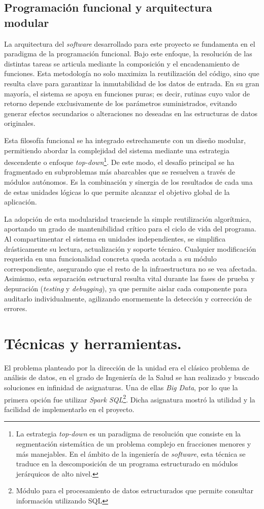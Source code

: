 \subsection{Programación funcional y arquitectura modular}
La arquitectura del \textit{software} desarrollado para este proyecto se fundamenta en el paradigma de la programación funcional. Bajo este enfoque, la resolución de las distintas tareas se articula mediante la composición y el encadenamiento de funciones. Esta metodología no solo maximiza la reutilización del código, sino que resulta clave para garantizar la inmutabilidad de los datos de entrada. En su gran mayoría, el sistema se apoya en funciones puras; es decir, rutinas cuyo valor de retorno depende exclusivamente de los parámetros suministrados, evitando generar efectos secundarios o alteraciones no deseadas en las estructuras de datos originales.

Esta filosofía funcional se ha integrado estrechamente con un diseño modular, permitiendo abordar la complejidad del sistema mediante una estrategia descendente o enfoque \textit{top-down}\footnote{La estrategia \textit{top-down} es un paradigma de resolución que consiste en la segmentación sistemática de un problema complejo en fracciones menores y más manejables. En el ámbito de la ingeniería de \textit{software}, esta técnica se traduce en la descomposición de un programa estructurado en módulos jerárquicos de alto nivel.}. De este modo, el desafío principal se ha fragmentado en subproblemas más abarcables que se resuelven a través de módulos autónomos. Es la combinación y sinergia de los resultados de cada una de estas unidades lógicas lo que permite alcanzar el objetivo global de la aplicación.

La adopción de esta modularidad trasciende la simple reutilización algorítmica, aportando un grado de mantenibilidad crítico para el ciclo de vida del programa. Al compartimentar el sistema en unidades independientes, se simplifica drásticamente su lectura, actualización y soporte técnico. Cualquier modificación requerida en una funcionalidad concreta queda acotada a su módulo correspondiente, asegurando que el resto de la infraestructura no se vea afectada. Asimismo, esta separación estructural resulta vital durante las fases de prueba y depuración (\textit{testing} y \textit{debugging}), ya que permite aislar cada componente para auditarlo individualmente, agilizando enormemente la detección y corrección de errores.

\section{Técnicas y herramientas.}
El problema planteado por la dirección de la unidad era el clásico problema de análisis de datos, en el grado de Ingeniería de la Salud se han realizado y buscado soluciones en infinidad de asignaturas. Una de ellas \textit{Big Data}, por lo que la primera opción fue utilizar \textit{Spark SQL}\footnote{Módulo para el procesamiento de datos estructurados que permite consultar información utilizando SQL}. Dicha asignatura mostró la utilidad y la facilidad de implementarlo en el proyecto. 

